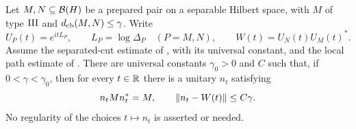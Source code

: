 \begin{lemma}
\label{lem:modular-near-normalizers}
Let $M,N\subseteq\mathcal B(H)$ be a prepared pair on a separable Hilbert space,
with $M$ of type $\mathrm{III}$ and $d_{\mathrm{cb}}(M,N)\leq\gamma$.  Write
\[
 U_P(t)=e^{itL_P},\qquad L_P=\log\Delta_P\quad(P=M,N),
 \qquad W(t)=U_N(t)U_M(t)^*.
\]
Assume the separated-cut estimate of , with its
universal constant, and the local path estimate of
.  There are universal constants
$\gamma_0>0$ and $C$ such that, if $0<\gamma<\gamma_0$, then for every
$t\in\mathbb R$ there is a unitary $n_t$ satisfying
\[
 n_tMn_t^*=M,\qquad \lVert n_t-W(t)\rVert\leq C\gamma.
\]
No regularity of the choices $t\mapsto n_t$ is asserted or needed.
\end{lemma}


